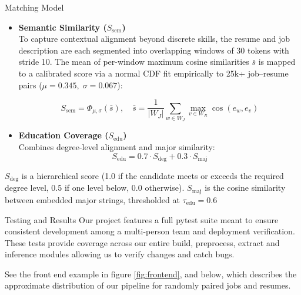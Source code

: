 \documentclass[final]{beamer}
\newlength{\colwidth}
\begin{document}
\begin{frame}[t]
\begin{columns}[t]
\begin{column}{\colwidth}
\begin{exampleblock}{Matching Model}
\begin{itemize}
        \item \textbf{Semantic Similarity ($S_{\text{sem}}$)} \\
        To capture contextual alignment beyond discrete skills, the resume and
        job description are each segmented into overlapping windows of 30 tokens
        with stride 10. The mean of per-window maximum cosine similarities
        $\bar{s}$ is mapped to a calibrated score via a normal CDF
        fit empirically to 25k+ job--resume pairs ($\mu = 0.345,\; \sigma = 0.067$):

        \begin{equation}
            S_{\text{sem}} = \Phi_{\mu,\sigma}(\bar{s}), \quad \bar{s} = \frac{1}{|W_J|}\sum_{w \in W_J} \max_{v \in W_R} \cos(e_w, e_v)
        \end{equation}

        \item \textbf{Education Coverage ($S_{\text{edu}}$)} \\
        Combines degree-level alignment and major similarity:
        \begin{equation}
            S_{\text{edu}} = 0.7 \cdot S_{\text{deg}} + 0.3 \cdot S_{\text{maj}}
        \end{equation}
    \end{itemize}

    $S_{\text{deg}}$ is a hierarchical score (1.0 if the candidate meets or
  exceeds the required degree level, 0.5 if one level below, 0.0 otherwise).
  $S_{\text{maj}}$ is the cosine similarity between embedded major strings,
  thresholded at $\tau_{\text{edu}} = 0.6$

  \end{exampleblock}


  \begin{block}{Testing and Results}
    Our project features a full pytest suite meant to ensure consistent development among a multi-person team and deployment verification.
    These tests provide coverage across our entire build, preprocess, extract and inference modules allowing us to verify changes and catch bugs.

    See the front end example in figure \ref{fig:frontend}, and below, which describes the approximate distribution of our pipeline for randomly paired jobs and resumes.


\end{block}
\end{column}
\end{columns}
\end{frame}
\end{document}
